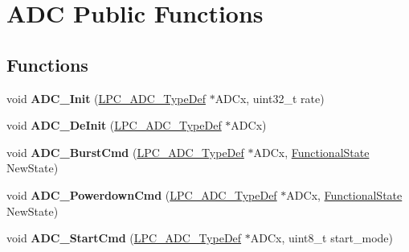 \hypertarget{group___a_d_c___public___functions}{\section{\-A\-D\-C \-Public \-Functions}
\label{group___a_d_c___public___functions}
}
\subsection*{\-Functions}
\begin{DoxyCompactItemize}
\item 
\hypertarget{group___a_d_c___public___functions_ga478a74858b834fc4352ed572cef09f08}{void {\bfseries \-A\-D\-C\-\_\-\-Init} (\hyperlink{struct_l_p_c___a_d_c___type_def}{\-L\-P\-C\-\_\-\-A\-D\-C\-\_\-\-Type\-Def} $\ast$\-A\-D\-Cx, uint32\-\_\-t rate)}\label{group___a_d_c___public___functions_ga478a74858b834fc4352ed572cef09f08}

\item 
\hypertarget{group___a_d_c___public___functions_ga912f61184ead8b2b21a2ab2da93b38c2}{void {\bfseries \-A\-D\-C\-\_\-\-De\-Init} (\hyperlink{struct_l_p_c___a_d_c___type_def}{\-L\-P\-C\-\_\-\-A\-D\-C\-\_\-\-Type\-Def} $\ast$\-A\-D\-Cx)}\label{group___a_d_c___public___functions_ga912f61184ead8b2b21a2ab2da93b38c2}

\item 
\hypertarget{group___a_d_c___public___functions_ga71ac27ff07336f95a4cb0c66879d5c09}{void {\bfseries \-A\-D\-C\-\_\-\-Burst\-Cmd} (\hyperlink{struct_l_p_c___a_d_c___type_def}{\-L\-P\-C\-\_\-\-A\-D\-C\-\_\-\-Type\-Def} $\ast$\-A\-D\-Cx, \hyperlink{group___l_p_c___types___public___types_gac9a7e9a35d2513ec15c3b537aaa4fba1}{\-Functional\-State} \-New\-State)}\label{group___a_d_c___public___functions_ga71ac27ff07336f95a4cb0c66879d5c09}

\item 
\hypertarget{group___a_d_c___public___functions_ga89387c7f3a10bd4a8d4c70383c7072c1}{void {\bfseries \-A\-D\-C\-\_\-\-Powerdown\-Cmd} (\hyperlink{struct_l_p_c___a_d_c___type_def}{\-L\-P\-C\-\_\-\-A\-D\-C\-\_\-\-Type\-Def} $\ast$\-A\-D\-Cx, \hyperlink{group___l_p_c___types___public___types_gac9a7e9a35d2513ec15c3b537aaa4fba1}{\-Functional\-State} \-New\-State)}\label{group___a_d_c___public___functions_ga89387c7f3a10bd4a8d4c70383c7072c1}

\item 
\hypertarget{group___a_d_c___public___functions_gac77395a6417558abde3d2886c3ebf3c8}{void {\bfseries \-A\-D\-C\-\_\-\-Start\-Cmd} (\hyperlink{struct_l_p_c___a_d_c___type_def}{\-L\-P\-C\-\_\-\-A\-D\-C\-\_\-\-Type\-Def} $\ast$\-A\-D\-Cx, uint8\-\_\-t start\-\_\-mode)}\label{group___a_d_c___public___functions_gac77395a6417558abde3d2886c3ebf3c8}


\end{DoxyCompactItemize}
